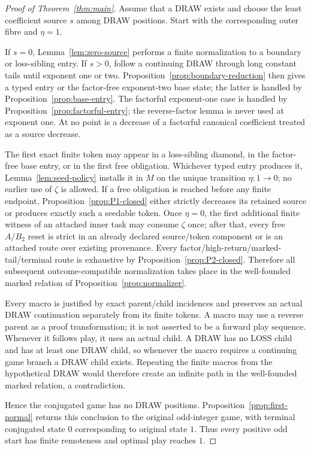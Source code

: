 \begin{proof}[Proof of Theorem~\ref{thm:main}]
Assume that a DRAW exists and choose the least coefficient source $s$ among
DRAW positions.  Start with the corresponding outer fibre and $\eta=1$.

If $s=0$, Lemma~\ref{lem:zero-source} performs a finite normalization to a
boundary or loss-sibling entry.  If $s>0$, follow a continuing DRAW through
long constant tails until exponent one or two.  Proposition~\ref{prop:boundary-reduction}
then gives a typed entry or the factor-free exponent-two base state; the
latter is handled by Proposition~\ref{prop:base-entry}.  The factorful
exponent-one case is handled by Proposition~\ref{prop:factorful-entry}; the
reverse-factor lemma is never used at exponent one.  At no point is a
decrease of a factorful canonical coefficient treated as a source decrease.

The first exact finite token may appear in a loss-sibling diamond, in the
factor-free base entry, or in the first free obligation.  Whichever typed
entry produces it, Lemma~\ref{lem:seed-policy} installs it in $M$ on the
unique transition $\eta:1\to0$; no earlier use of $\zeta$ is allowed.  If a
free obligation is reached before any finite endpoint, Proposition~\ref{prop:P1-closed}
either strictly decreases its retained source or produces exactly such a
seedable token.  Once $\eta=0$, the first additional finite witness of an
attached inner task may consume $\zeta$ once; after that, every free
$A/B_2$ reset is strict in an already declared source/token component or is
an attached route over existing provenance.  Every factor/high-return/marked-
tail/terminal route is exhaustive by Proposition~\ref{prop:P2-closed}.
Therefore all subsequent outcome-compatible normalization takes place in the
well-founded marked relation of Proposition~\ref{prop:normalizer}.

Every macro is justified by exact parent/child incidences and preserves an
actual DRAW continuation separately from its finite tokens.  A macro may use
a reverse parent as a proof transformation; it is not asserted to be a
forward play sequence.  Whenever it follows play, it uses an actual child.
A DRAW has no LOSS child and has at least one DRAW child, so whenever the
macro requires a continuing game branch a DRAW child exists.  Repeating the finite macros from the hypothetical DRAW
would therefore create an infinite path in the well-founded marked relation,
a contradiction.

Hence the conjugated game has no DRAW positions.  Proposition~\ref{prop:first-normal}
returns this conclusion to the original odd-integer game, with terminal
conjugated state $0$ corresponding to original state $1$.  Thus every
positive odd start has finite remoteness and optimal play reaches $1$.
\end{proof}


